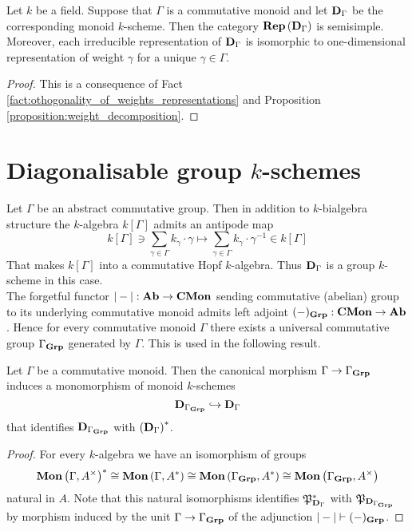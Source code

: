 \begin{corollary}\label{corollary:representations_of_diagonalisable_monoids}
Let $k$ be a field. Suppose that $\Gamma$ is a commutative monoid and let $\mathbf{D}_{\Gamma}$ be the corresponding monoid $k$-scheme. Then the category $\mathbf{Rep}\left(\mathbf{D}_{\Gamma}\right)$ is semisimple. Moreover, each irreducible representation of $\mathbf{D}_{\Gamma}$ is isomorphic to one-dimensional representation of weight $\gamma$ for a unique $\gamma \in \Gamma$.
\end{corollary}
\begin{proof}
This is a consequence of Fact \ref{fact:othogonality_of_weights_representations} and Proposition \ref{proposition:weight_decomposition}.
\end{proof}

\section{Diagonalisable group $k$-schemes}
\noindent
Let $\Gamma$ be an abstract commutative group. Then in addition to $k$-bialgebra structure the $k$-algebra $k[\Gamma]$ admits an antipode map
$$k[\Gamma]\ni \sum_{\gamma\in \Gamma}k_{\gamma}\cdot \gamma \mapsto \sum_{\gamma\in \Gamma}k_{\gamma}\cdot \gamma^{-1}\in k[\Gamma]$$
That makes $k[\Gamma]$ into a commutative Hopf $k$-algebra. Thus $\mathbf{D}_{\Gamma}$ is a group $k$-scheme in this case.\\
The forgetful functor $|-|:\mathbf{Ab}\rightarrow \mathbf{CMon}$ sending commutative (abelian) group to its underlying commutative monoid admits left adjoint $(-)_{\mathbf{Grp}}:\mathbf{CMon}\rightarrow \mathbf{Ab}$. Hence for every commutative monoid $\Gamma$ there exists a universal commutative group $\Gamma_{\mathbf{Grp}}$ generated by $\Gamma$. This is used in the following result.

\begin{proposition}\label{proposition:diagonalisable_monoid_k_schemes_its_group_of_units}
Let $\Gamma$ be a commutative monoid. Then the canonical morphism $\Gamma \rightarrow \Gamma_{\mathbf{Grp}}$ induces a monomorphism of monoid $k$-schemes
$$\mathbf{D}_{\Gamma_{\mathbf{Grp}}} \hookrightarrow \mathbf{D}_{\Gamma}$$
that identifies $\mathbf{D}_{\Gamma_{\mathbf{Grp}}}$ with $\left( \mathbf{D}_{\Gamma} \right)^*$.
\end{proposition}
\begin{proof}
For every $k$-algebra we have an isomorphism of groups
$$\mathbf{Mon}\left(\Gamma,A^{\times}\right)^* \cong \mathbf{Mon}\left(\Gamma,A^*\right) \cong \mathbf{Mon}\left(\Gamma_{\mathbf{Grp}},A^*\right) \cong \mathbf{Mon}\left(\Gamma_{\mathbf{Grp}},A^{\times}\right)$$
natural in $A$. Note that this natural isomorphisms identifies ${\mathfrak P}_{\mathbf{D}_{\Gamma}}^*$ with ${\mathfrak P}_{\mathbf{D}_{\Gamma_{\mathbf{Grp}}}}$ by morphism induced by the unit $\Gamma\rightarrow \Gamma_{\mathbf{Grp}}$ of the adjunction $|-|\vdash (-)_{\mathbf{Grp}}$.
\end{proof}


